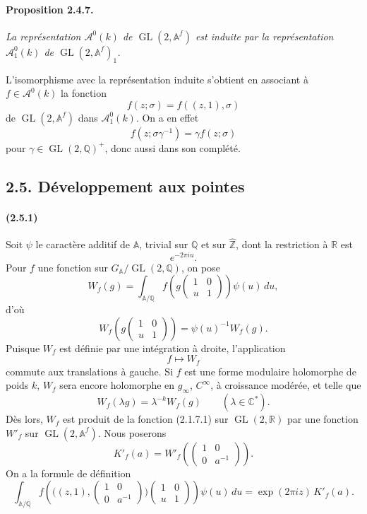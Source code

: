 \documentclass[10pt,a4paper]{article}
\providecommand{\GL}{\operatorname{GL}}
\providecommand{\R}{\mathbb R}
\providecommand{\Q}{\mathbb Q}
\providecommand{\Z}{\mathbb Z}
\providecommand{\C}{\mathbb C}
\providecommand{\A}{\mathbb A}
\providecommand{\Af}{\mathbb A^f}
\begin{document}
\paragraph{Proposition 2.4.7.}{\itshape  La représentation \(\mathcal A^0(k)\) de \(\GL(2,\Af)\) est induite par la représentation \(\mathcal A_1^0(k)\) de \(\GL(2,\Af)_1\).\par}

L'isomorphisme avec la représentation induite s'obtient en associant à \(f\in \mathcal A^0(k)\) la fonction
\[
f(z;\sigma)=f((z,1),\sigma)
\]
de \(\GL(2,\Af)\) dans \(\mathcal A_1^0(k)\). On a en effet
\[
f(z;\sigma\gamma^{-1})=\gamma f(z;\sigma)
\]
pour \(\gamma\in\GL(2,\Q)^+\), donc aussi dans son complété.

\clearpage
{}
\hypertarget{authority-34}{}
\subsection*{2.5. Développement aux pointes}

\paragraph{(2.5.1)} Soit \(\psi\) le caractère additif de \(\A\), trivial sur \(\Q\) et sur \(\widehat{\Z}\), dont la restriction à \(\R\) est
\[
e^{-2\pi iu}.
\]
Pour \(f\) une fonction sur \(G_{\A}/\GL(2,\Q)\), on pose
\[
W_f(g)=
\int_{\A/\Q}
f\!\left(g\begin{pmatrix}1&0\\ u&1\end{pmatrix}\right)\psi(u)\,du,
\]
d'où
\[
W_f\!\left(g\begin{pmatrix}1&0\\ u&1\end{pmatrix}\right)
=
\psi(u)^{-1}W_f(g).
\]
Puisque \(W_f\) est définie par une intégration à droite, l'application
\[
f\longmapsto W_f
\]
commute aux translations à gauche. Si \(f\) est une forme modulaire holomorphe de poids \(k\), \(W_f\) sera encore holomorphe en \(g_\infty\), \(C^\infty\), à croissance modérée, et telle que
\[
W_f(\lambda g)=\lambda^{-k}W_f(g)
\qquad(\lambda\in\C^*).
\]
Dès lors, \(W_f\) est produit de la fonction (2.1.7.1) sur \(\GL(2,\R)\) par une fonction \(W'_f\) sur \(\GL(2,\Af)\). Nous poserons
\[
K'_f(a)=
W'_f\!\left(\begin{pmatrix}1&0\\0&a^{-1}\end{pmatrix}\right).
\]
On a la formule de définition
\[
\tag{2.5.1.1}
\int_{\A/\Q}
f\!\left(\bigl((z,1),
\begin{pmatrix}1&0\\0&a^{-1}\end{pmatrix}\bigr)
\begin{pmatrix}1&0\\u&1\end{pmatrix}\right)\psi(u)\,du
=
\exp(2\pi iz)\,K'_f(a).
\]
\end{document}
